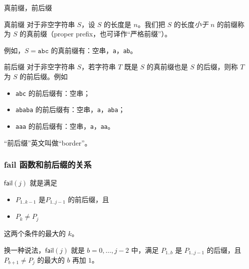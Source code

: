 \documentclass{ctexbeamer}
\newcommand{\str}[1]{\texttt{#1}}
\newcommand{\fail}{\mathsf{fail}}
\begin{document}
\begin{frame}{真前缀，前后缀}

\begin{block}{真前缀}
  对于非空字符串 $S$，设 $S$ 的长度是 $n$。我们把 $S$ 的长度\emph{小于} $n$ 的前缀称为 $S$ 的{\kaishu 真前缀}（proper prefix，也可译作``严格前缀''）。

  例如，$S= \str{abc}$ 的真前缀有：空串，\str{a}，\str{ab}。
\end{block}

\begin{block}{前后缀}
对于非空字符串 $S$，若字符串 $T$ 既是 $S$ 的真前缀也是 $S$ 的后缀，则称 $T$ 为 $S$ 的前后缀。例如 
\begin{itemize}
  \item \str{abc} 的前后缀有：空串；
  \item \str{ababa} 的前后缀有：空串，\str{a}，\str{aba}；
  \item \str{aaa} 的前后缀有：空串，\str{a}，\str{aa}。
\end{itemize}
\end{block}

“前后缀”英文叫做“border”。
\end{frame}

\begin{frame}
  \frametitle{fail 函数和前后缀的关系}

  $\fail(j)$ 就是满足
  \begin{itemize}
    \item $P_{1..k-1}$ 是$P_{1..j-1}$ 的前后缀，且
    \item $P_{k} \ne P_j$
  \end{itemize}
  这两个条件的{\kaishu 最大的} $k$。

  \begin{block}{}
    换一种说法，$\fail(j)$ 就是 $b = 0, \dots, j-2$ 中，满足 $P_{1..b}$ 是 $P_{1..j-1}$ 的{\kaishu 后缀}，且 $P_{b+1} \ne P_j$ 的最大的 $b$ 再加 $1$。
  \end{block}
\end{frame}
\end{document}
